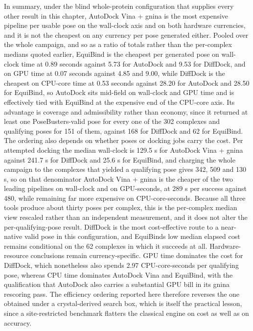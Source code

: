 In summary, under the blind whole-protein configuration that supplies every other result in this chapter, AutoDock Vina + gnina is the most expensive pipeline per usable pose on the wall-clock axis and on both hardware currencies, and it is not the cheapest on any currency per pose generated either. Pooled over the whole campaign, and so as a ratio of totals rather than the per-complex medians quoted earlier, EquiBind is the cheapest per generated pose on wall-clock time at 0.89 seconds against 5.73 for AutoDock and 9.53 for DiffDock, and on GPU time at 0.07 seconds against 4.85 and 9.00, while DiffDock is the cheapest on CPU-core time at 0.53 seconds against 28.20 for AutoDock and 28.50 for EquiBind, so AutoDock sits mid-field on wall-clock and GPU time and is effectively tied with EquiBind at the expensive end of the CPU-core axis. Its advantage is coverage and admissibility rather than economy, since it returned at least one PoseBusters-valid pose for every one of the 302 complexes and qualifying poses for 151 of them, against 168 for DiffDock and 62 for EquiBind. The ordering also depends on whether poses or docking jobs carry the cost. Per attempted docking the median wall-clock is 129.5 s for AutoDock Vina + gnina against 241.7 s for DiffDock and 25.6 s for EquiBind, and charging the whole campaign to the complexes that yielded a qualifying pose gives 342, 509 and 130 s, so on that denominator AutoDock Vina + gnina is the cheaper of the two leading pipelines on wall-clock and on GPU-seconds, at 289 s per success against 480, while remaining far more expensive on CPU-core-seconds. Because all three tools produce about thirty poses per complex, this is the per-complex median view rescaled rather than an independent measurement, and it does not alter the per-qualifying-pose result. DiffDock is the most cost-effective route to a near-native valid pose in this configuration, and EquiBind\textquotesingle s low median elapsed cost remains conditional on the 62 complexes in which it succeeds at all. Hardware-resource conclusions remain currency-specific. GPU time dominates the cost for DiffDock, which nonetheless also spends 2.97 CPU-core-seconds per qualifying pose, whereas CPU time dominates AutoDock Vina and EquiBind, with the qualification that AutoDock also carries a substantial GPU bill in its gnina rescoring pass. The efficiency ordering reported here therefore reverses the one obtained under a crystal-derived search box, which is itself the practical lesson, since a site-restricted benchmark flatters the classical engine on cost as well as on accuracy.

